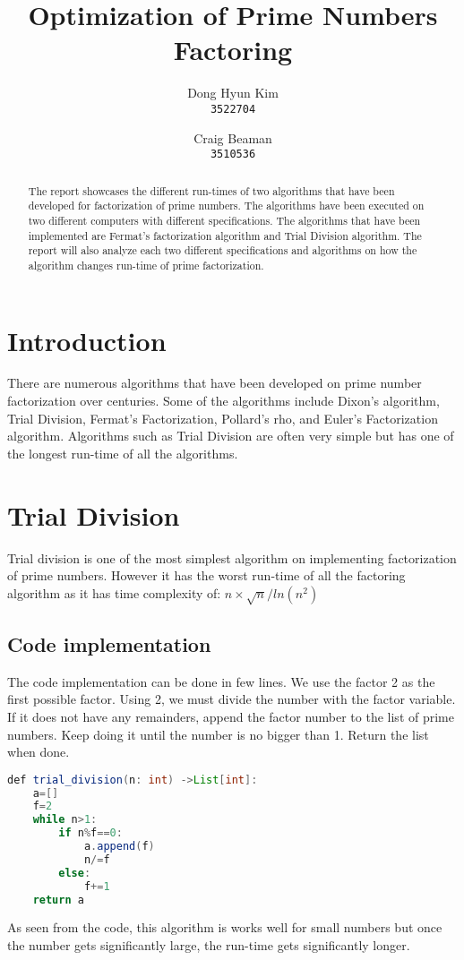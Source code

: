 \documentclass[]{article}
\title{Optimization of Prime Numbers Factoring}
\author{
	Dong Hyun Kim\\
\texttt{3522704}
\and
Craig Beaman\\
\texttt{3510536}}
\begin{document}
\maketitle

\begin{abstract}
The report showcases the different run-times of two algorithms that have been developed for factorization of prime numbers. The algorithms have been executed on two different computers with different specifications. The algorithms that have been implemented are Fermat's factorization algorithm and Trial Division algorithm. The report will also analyze each two different specifications and algorithms on how the algorithm changes run-time of prime factorization. 
\end{abstract}

\section{Introduction}
There are numerous algorithms that have been developed on prime number factorization over centuries. Some of the algorithms include Dixon's algorithm, Trial Division, Fermat's Factorization, Pollard's rho, and Euler's Factorization algorithm. Algorithms such as Trial Division are often very simple but has one of the longest run-time of all the algorithms.
\section{Trial Division}
Trial division is one of the most simplest algorithm on implementing factorization of prime numbers. However it has the worst run-time of all the factoring algorithm as it has time complexity of: $n\times \sqrt{n}/ln(n^2)$
\subsection{Code implementation}
The code implementation can be done in few lines. We use the factor 2 as the first possible factor. Using 2, we must divide the number with the factor variable. If it does not have any remainders, append the factor number to the list of prime numbers. Keep doing it until the number is no bigger than 1. Return the list when done.
\\ 
\begin{lstlisting}[language=Java]
def trial_division(n: int) ->List[int]:
	a=[]
	f=2
	while n>1:
		if n%f==0:
			a.append(f)
			n/=f
		else:
			f+=1
	return a
\end{lstlisting}
As seen from the code, this algorithm is works well for small numbers but once the number gets significantly large, the run-time gets significantly longer.
\end{document}
